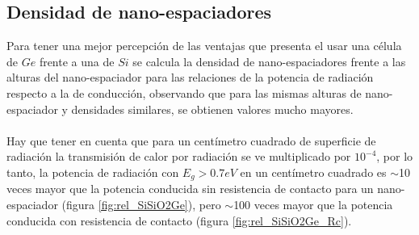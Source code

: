\subsection{Densidad de nano-espaciadores}
Para tener una mejor percepción de las ventajas que presenta el usar una célula de $Ge$ frente a una de $Si$ se calcula la densidad de nano-espaciadores frente a las alturas del nano-espaciador para las relaciones de la potencia de radiación respecto a la de conducción, observando que para las mismas alturas de nano-espaciador y densidades similares, se obtienen valores mucho mayores.\\\\
Hay que tener en cuenta que para un centímetro cuadrado de superficie de radiación la transmisión de calor por radiación se ve multiplicado por $10^{-4}$, por lo tanto, la potencia de radiación con $E_g>0.7eV$ en un centímetro cuadrado es $\sim$10 veces mayor que la potencia conducida sin resistencia de contacto para un nano-espaciador (figura \ref{fig:rel_SiSiO2Ge}), pero $\sim$100 veces mayor que la potencia conducida con resistencia de contacto (figura \ref{fig:rel_SiSiO2Ge_Rc}).
